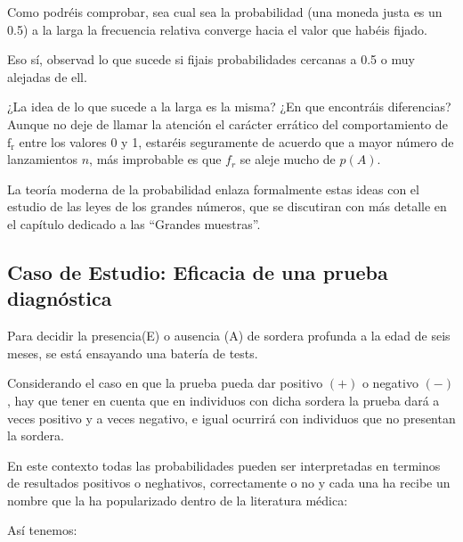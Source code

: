 \documentclass[
]{article}
\begin{document}
Como podréis comprobar, sea cual sea la probabilidad (una moneda justa es un 0.5) a la larga la frecuencia relativa converge hacia el valor que habéis fijado.

Eso sí, observad lo que sucede si fijais probabilidades cercanas a 0.5 o muy alejadas de ell.

¿La idea de lo que sucede a la larga es la misma? ¿En que encontráis diferencias?
Aunque no deje de llamar la atención el carácter errático del comportamiento de \(\mathrm{f}_{\mathrm{r}}\) entre los valores 0 y 1, estaréis seguramente de acuerdo que a mayor
número de lanzamientos \(n\), más improbable es que \(f_{r}\) se aleje
mucho de \(p(A)\).

La teoría moderna de la probabilidad enlaza formalmente estas ideas con
el estudio de las leyes de los grandes números, que se discutiran con más detalle en el capítulo dedicado a las ``Grandes muestras''.

\subsection{Caso de Estudio: Eficacia de una prueba diagnóstica}\label{caso-de-estudio-eficacia-de-una-prueba-diagnuxf3stica}

Para decidir la presencia(E) o ausencia (A) de sordera profunda a la edad de seis meses, se está ensayando una batería de tests.

Considerando el caso en que la prueba pueda dar positivo \((+)\) o negativo \((-)\), hay que tener en cuenta que en individuos con dicha sordera la prueba dará a veces positivo y a veces negativo, e igual ocurrirá con individuos que no presentan la sordera.

En este contexto todas las probabilidades pueden ser interpretadas en terminos de resultados positivos o neghativos, correctamente o no y cada una ha recibe un nombre que la ha popularizado dentro de la literatura médica:

Así tenemos:
\end{document}
